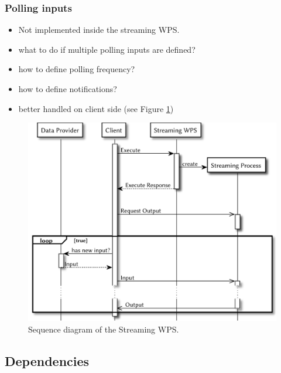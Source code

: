 	\subsubsection{Polling inputs}
		\begin{itemize}
			\item Not implemented inside the streaming WPS.
			\item what to do if multiple polling inputs are defined?
			\item how to define polling frequency?
			\item how to define notifications?
			\item better handled on client side (see Figure \ref{fig:sd:polling})
		\end{itemize}
		\begin{figure}[!htb]
			\centering
			\includegraphics[width=.7868\textwidth]{figures/sequence-diagramm-polling.pdf}
			\caption{\label{fig:sd:polling} Sequence diagram of the Streaming WPS.}
		\end{figure}

	\subsection{Dependencies}

